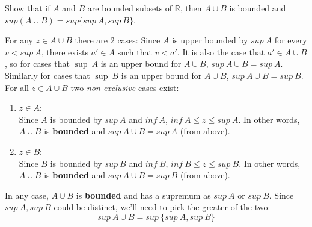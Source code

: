 \documentclass[boxes, qed]{homework}
\begin{document}
\newenvironment{amatrix}[1]{%
  \left[\begin{array}{@{}*{#1}{c}|c@{}}
}{%
  \end{array}\right]
}

\newenvironment{augmatrix}[1]{%
  \left[\begin{array}{#1}
}{%
  \end{array}\right]
}
\begin{problem}Show that if $A$ and $B$ are bounded
  subsets of $\mathbb{R}$, then $A\cup{B}$ is bounded
  and $sup(A\cup{B}) = sup\{sup\ A, sup\ B\}$.
\end{problem}
\begin{solution}
  For any $z\in{A\cup{B}}$ there are 2 cases:
    Since $A$ is upper bounded by $sup\ A$ for every $v<sup\ A$, 
    there exists $a'\in{A}$ such that $v<a'$. 
    It is also the case that $a'\in{A\cup{B}}$, so for cases
    that $\sup\ A$ is an upper bound for $A\cup{B}$, $sup\ A\cup{B} = sup\ A$.
    Similarly for cases that $\sup\ B$ is an upper bound for $A\cup{B}$, 
    $sup\ A\cup{B} = sup\ B$.\\

    For all $z\in{A\cup{B}}$ two \textit{non exclusive} cases exist:
    \begin{enumerate}
      \item $z\in{A}$:\\
      Since $A$ is bounded by $sup\ A$ and $inf\ A$,
      $inf\ A \le{z}\le{sup\ A}$. In other words,
      $A\cup{B}$ is \textbf{bounded} and 
      $sup\ A\cup{B} = sup\ A$ (from above).
      \item $z\in{B}$:\\
      Since $B$ is bounded by $sup\ B$ and $inf\ B$,
      $inf\ B \le{z}\le{sup\ B}$. In other words,
      $A\cup{B}$ is \textbf{bounded} and 
      $sup\ A\cup{B} = sup\ B$ (from above).
    \end{enumerate}
    In any case, $A\cup{B}$ is \textbf{bounded} and 
    has a supremum as $sup\ A$ or $sup\ B$. Since $sup\ A,sup\ B$
    could be distinct, we'll need to pick the greater of the two:
    $$sup\ A\cup{B}=sup\ \{sup\ A,sup\ B\}$$
\end{solution}
\end{document}
